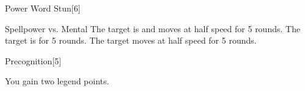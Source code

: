 \begin{spellsection}{Power Word Stun}[6]
    \begin{spellheader}
    \end{spellheader}
    \begin{spellcontent}
        \begin{spelltargetinginfo}
        \end{spelltargetinginfo}
        \begin{spelleffects}
            \begin{spellattack}{Spellpower vs. Mental}
                \spellsuccess The target is \dazed and moves at half speed for 5 rounds.
                \spellcritical The target is \stunned for 5 rounds.
                \spellfailure The target moves at half speed for 5 rounds.
            \end{spellattack}
        \end{spelleffects}
    \end{spellcontent}
    \begin{spellfooter}
        \miscastrandom
    \end{spellfooter}
\end{spellsection}

\begin{spellsection}{Precognition}[5]
    \begin{spellheader}
    \end{spellheader}
    \begin{spellcontent}
        \begin{spelltargetinginfo}
        \end{spelltargetinginfo}
        \begin{spelleffects}
            \spelleffect You gain two legend points.
            \spelldur \durshort \dismissable
        \end{spelleffects}
    \end{spellcontent}
    \begin{spellfooter}
        \miscastexplode
    \end{spellfooter}
\end{spellsection}

